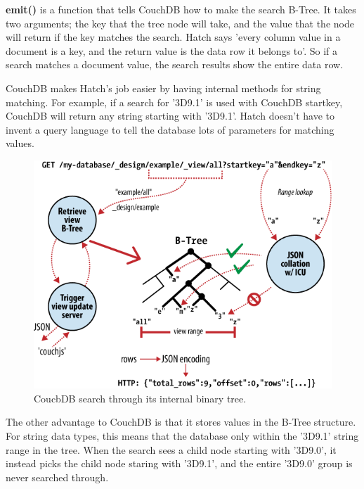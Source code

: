 \textbf{emit()} is a function that tells CouchDB how to make the search B-Tree. It 
takes two arguments; the key that the tree node will take, and the value that the 
node will return if the key matches the search. Hatch says 'every column value in a 
document is a key, and the return value is the data row it belongs to'. So if a search
matches a document value, the search results show the entire data row.

CouchDB makes Hatch's job easier by having internal methods for string matching. For
example, if a search for '3D9.1' is used with CouchDB startkey, CouchDB will return
any string starting with '3D9.1'. Hatch doesn't have to invent a query language to 
tell the database lots of parameters for matching values.

\begin{figure}[h]
	\begin{center}
	\includegraphics[width=120mm]{images/couchdb_b_tree}
	\caption{CoucbDB search through its internal binary tree.} 
	\label{couchdb_b_tree}
	\end{center}
\end{figure}

The other advantage to CouchDB is that it stores values in the B-Tree structure. For
string data types, this means that the database only within the '3D9.1' string range
in the tree. When the search sees a child node starting with '3D9.0', it instead picks
the child node staring with '3D9.1', and the entire '3D9.0' group is never searched 
through. 
